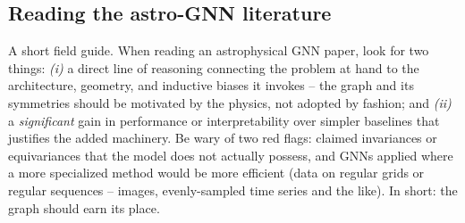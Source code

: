 \subsection{Reading the astro-GNN literature}
A short field guide. When reading an astrophysical GNN paper, look for two
things: \emph{(i)} a direct line of reasoning connecting the problem at hand to
the architecture, geometry, and inductive biases it invokes -- the graph and
its symmetries should be motivated by the physics, not adopted by fashion; and
\emph{(ii)} a \emph{significant} gain in performance or interpretability over
simpler baselines that justifies the added machinery. Be wary of two red flags:
claimed invariances or equivariances that the model does not actually possess,
and GNNs applied where a more specialized method would be more efficient (data
on regular grids or regular sequences -- images, evenly-sampled time series and
the like). In short: the graph should earn its place.
